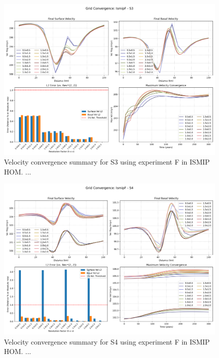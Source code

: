 \begin{figure}[H]
    \includegraphics[scale=0.40]{IsmipF_S3_convergence_summary.png}
    \caption{Velocity convergence summary for S3 using experiment F in ISMIP HOM. ... }
    \label{fig:grid_conv_S3}
\end{figure}
\begin{figure}[H]
    \includegraphics[scale=0.40]{IsmipF_S4_convergence_summary.png}
    \caption{Velocity convergence summary for S4 using experiment F in ISMIP HOM. ... }
    \label{fig:grid_conv_S4}
\end{figure}

